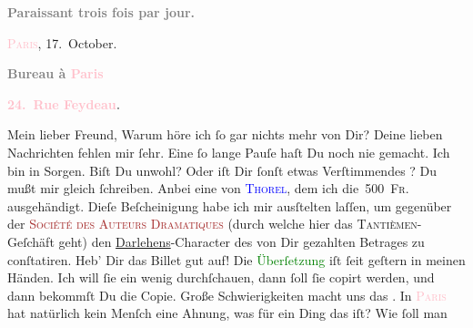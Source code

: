            \pstart
           \begin{otherlanguage}{french}\textcolor{gray}{\textbf{\textbf{Paraissant trois fois par jour.}}}\end{otherlanguage}\hfill \textsc{\textcolor{pink}{Paris}{}\ledrightnote{\textcolor{pink}{Paris}}}, 17. October.\pend
           \pstart
           \begin{otherlanguage}{french}\textcolor{gray}{\textbf{\textbf{Bureau à \textcolor{pink}{Paris}{}\ledrightnote{\textcolor{pink}{Paris}}}}}\end{otherlanguage}\pend
           \pstart
           \begin{otherlanguage}{french}\textcolor{gray}{\textbf{\textbf{\textcolor{pink}{24. Rue Feydeau}{}\ledrightnote{\textcolor{pink}{rue Feydeau}}.}}}\end{otherlanguage}\pend
           \pstart{}Mein lieber Freund,\pend\pstart
           Warum höre ich ſo gar nichts mehr von Dir? Deine lieben Nachrichten fehlen mir ſehr.
               Eine ſo lange Pauſe haſt Du noch nie gemacht. Ich bin in Sorgen. Biſt Du unwohl? Oder
               iſt Dir ſonſt etwas Verſtimmendes \label{K_L02787-1v}\label{K_L02787-1h}? Du mußt mir gleich ſchreiben.\pend
           \pstart
           Anbei eine \label{K_L02787-2v}\label{K_L02787-2h} von \textsc{\textcolor{blue}{Thorel}{}\ledrightnote{\textcolor{blue}{Jean Thorel}}}, dem ich die 500 \textsc{Fr.} ausgehändigt. Dieſe
               Beſcheinigung habe ich mir ausſtelten laſſen, um gegenüber der \textsc{\textcolor{brown}{Société des Auteurs Dramatiques}{}\ledrightnote{\textcolor{brown}{Société des Auteurs et Compositeurs Dramatiques}}} (durch welche hier das \textsc{Tantièmen}-Geſchäft geht) {\pb}den \uline{Darlehens}-Character des von Dir gezahlten Betrages zu conſtatiren. Heb’ Dir das
               Billet gut auf!\pend
           \pstart
           Die \textcolor{green}{Überſetzung}{} iſt ſeit geſtern in meinen Händen. Ich will ſie ein wenig
               durchſchauen, dann ſoll ſie copirt werden, und dann bekommſt Du die Copie. Große Schwierigkeiten macht uns das
                  \label{K_L02787-3v}\label{K_L02787-3h}. In \textsc{\textcolor{pink}{Paris}{}\ledrightnote{\textcolor{pink}{Paris}}} hat natürlich kein Menſch eine Ahnung, was für ein Ding das iſt? Wie ſoll man
